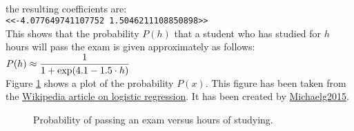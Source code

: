 \\[0.2cm]
the resulting coefficients are:
\\[0.2cm]
\hspace*{1.3cm}
\texttt{<<-4.077649741107752 1.5046211108850898>>}
\\[0.2cm]
This shows that the probability $P(h)$ that a student who has studied for $h$ hours will pass the
exam is given approximately as follows:
\\[0.2cm]
\hspace*{1.3cm}
$\displaystyle P(h) \approx \frac{1}{1 + \exp(4.1 - 1.5 \cdot h)}$
\\[0.2cm]
Figure \ref{fig:exam-pass.eps} shows a plot of the probability $P(x)$.  This
figure has been taken from the
\href{https://en.wikipedia.org/wiki/Logistic_regression#Fields_and_example_applications}{Wikipedia article on logistic regression}. 
It has been created by \href{https://commons.wikimedia.org/w/index.php?curid=42442194}{Michaelg2015}.


\begin{figure}[!th]
\centering
{}
\vspace*{-0.3cm}
\caption{Probability of passing an exam versus hours of studying.}
\label{fig:exam-pass.eps}
\end{figure}



